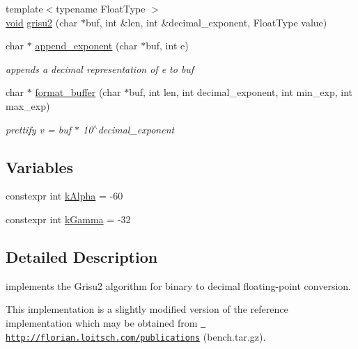 \begin{DoxyCompactItemize}
\item 
{\footnotesize template$<$typename Float\+Type $>$ }\\\mbox{\hyperlink{namespacenlohmann_1_1detail_a59fca69799f6b9e366710cb9043aa77d}{void}} \mbox{\hyperlink{namespacenlohmann_1_1detail_1_1dtoa__impl_aab7a9670a4f4704a5d0347ad7588576b}{grisu2}} (char $\ast$buf, int \&len, int \&decimal\+\_\+exponent, Float\+Type value)
\item 
char $\ast$ \mbox{\hyperlink{namespacenlohmann_1_1detail_1_1dtoa__impl_a84733638b826eda624488f5fa4521e0b}{append\+\_\+exponent}} (char $\ast$buf, int e)
\begin{DoxyCompactList}\small\item\em appends a decimal representation of e to buf \end{DoxyCompactList}\item 
char $\ast$ \mbox{\hyperlink{namespacenlohmann_1_1detail_1_1dtoa__impl_a12c1c5d8b46ba9702186445e73f86afe}{format\+\_\+buffer}} (char $\ast$buf, int len, int decimal\+\_\+exponent, int min\+\_\+exp, int max\+\_\+exp)
\begin{DoxyCompactList}\small\item\em prettify v = buf $\ast$ 10$^\wedge$decimal\+\_\+exponent \end{DoxyCompactList}\end{DoxyCompactItemize}
\subsection*{Variables}
\begin{DoxyCompactItemize}
\item 
constexpr int \mbox{\hyperlink{namespacenlohmann_1_1detail_1_1dtoa__impl_ac1ea1316de0b4a219f707c76b1db1966}{k\+Alpha}} = -\/60
\item 
constexpr int \mbox{\hyperlink{namespacenlohmann_1_1detail_1_1dtoa__impl_a4a750fcc38da1ce68b7e25ab3a230e20}{k\+Gamma}} = -\/32
\end{DoxyCompactItemize}


\subsection{Detailed Description}
implements the Grisu2 algorithm for binary to decimal floating-\/point conversion. 

This implementation is a slightly modified version of the reference implementation which may be obtained from \href{http://florian.loitsch.com/publications}{\texttt{ http\+://florian.\+loitsch.\+com/publications}} (bench.\+tar.\+gz).

